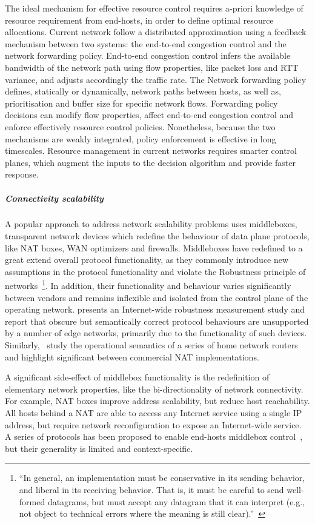 The ideal mechanism for effective resource control requires a-priori knowledge
of resource requirement from end-hosts, in order to define optimal resource
allocations.  Current network follow a distributed approximation using a
feedback mechanism between two systems: the end-to-end congestion control and
the network forwarding policy.  End-to-end congestion control infers the
available bandwidth of the network path using flow properties, like packet loss
and RTT variance, and adjusts accordingly the traffic rate. The Network
forwarding policy defines, statically or dynamically, network paths between
hosts, as well as, prioritisation and buffer size for specific network flows.
Forwarding policy decisions can modify flow properties, affect end-to-end
congestion control and enforce effectively resource control policies.
Nonetheless, because the two mechanisms are weakly integrated, policy
enforcement is effective in long timescales.  Resource management in current
networks requires smarter control planes, which augment the inputs to the
decision algorithm and provide faster response.

\subparagraph*{Connectivity scalability} 

A popular approach to address network scalability problems uses middleboxes,
transparent network devices which redefine the behaviour of data plane
protocols, like NAT boxes, WAN optimizers and firewalls.  Middleboxes have
redefined to a great extend overall protocol functionality, as they commonly
introduce new assumptions in the protocol functionality and violate the
Robustness principle of networks~\footnote{``In general, an implementation must
  be conservative in its sending behavior, and liberal in its receiving
  behavior.  That is, it must be careful to send well-formed datagrams, but must
  accept any datagram that it can interpret (e.g., not object to technical
  errors where the meaning is still clear).''~}. 
In addition, their functionality and behaviour varies significantly between
vendors and remains inflexible and isolated from the
control plane of the operating network. 
 presents an Internet-wide robustness measurement study and
report that obscure but semantically correct protocol behaviours are unsupported
by a number of edge networks, primarily due to the functionality of such
devices. Similarly,~ study the operational semantics of a series
of home network routers and highlight significant between commercial NAT
implementations. 

A significant side-effect of middlebox functionality is the redefinition of
elementary network properties, like the bi-directionality of network
connectivity.  For example, NAT boxes improve address scalability, but reduce
host reachability.  All hosts behind a NAT are able to access any Internet
service using a single IP address, but require network reconfiguration to expose
an Internet-wide service. A series of protocols has been proposed to 
enable end-hosts middlebox control~, but their generality is
limited and context-specific.


